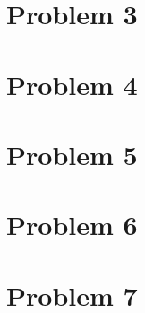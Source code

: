 	\newpage
	\section*{Problem 3}\label{sec:prob-3}


	\newpage
	\section*{Problem 4}\label{sec:prob-4}


	\newpage
	\section*{Problem 5}\label{sec:prob-5}


	\newpage
	\section*{Problem 6}\label{sec:prob-6}


	\newpage
	\section*{Problem 7}\label{sec:prob-7}

	
	
	
